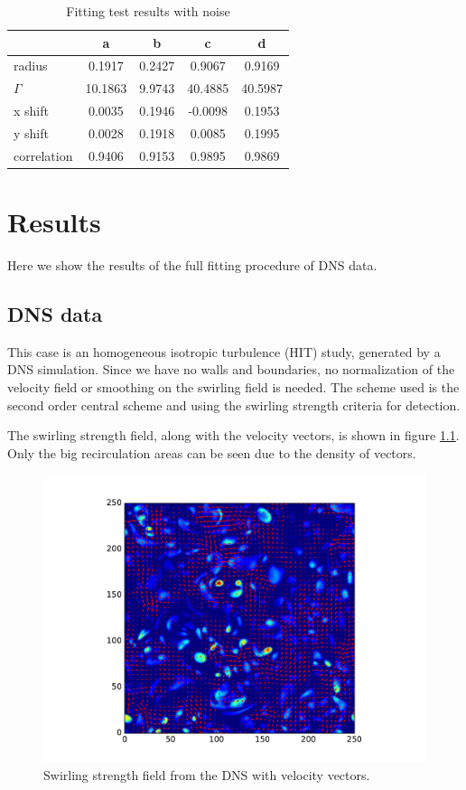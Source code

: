\documentclass[12pt, a4paper, openany]{memoir}
\begin{document}
\begin{table}[h]
	\centering
	\caption{Fitting test results with noise}
	\vspace{10px}
	\label{tb:fittingtestnoise}
	\begin{tabular}{l|c|c|c|c}
		            & a      & b & c & d \\
		\hline
		radius      & 0.1917   & 0.2427 & 0.9067 & 0.9169  \\
		$\Gamma$       & 10.1863 & 9.9743 & 40.4885 & 40.5987 \\
		x shift     & 0.0035  & 0.1946 & -0.0098 & 0.1953 \\
		y shift     & 0.0028  & 0.1918 & 0.0085 & 0.1995 \\ 
		correlation & 0.9406   & 0.9153 & 0.9895 & 0.9869 \\
	\end{tabular}
\end{table}


\chapter{Results}
Here we show the results of the full fitting procedure of DNS data.

\section{DNS data}
This case is an homogeneous isotropic turbulence (HIT) study, generated by a DNS simulation. Since we have no walls and boundaries, no normalization of the velocity field or smoothing on the swirling field is needed. The scheme used is the second order central scheme and using the swirling strength criteria for detection.

The swirling strength field, along with the velocity vectors, is shown in figure \ref{fig:swirling}. Only the big recirculation areas can be seen due to the density of vectors.

\begin{figure}[h]
	\centering
	\includegraphics[scale=0.6]{figure/swirling_vector.pdf}
	\caption{Swirling strength field from the DNS with velocity vectors.}
	\label{fig:swirling}
\end{figure}
\end{document}
